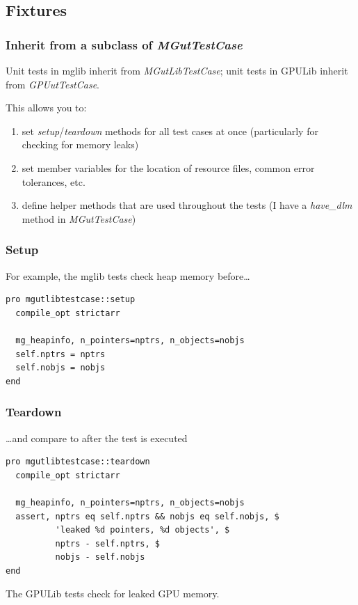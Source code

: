 \documentclass[12pt, handout]{beamer}
\begin{document}
\subsection{Fixtures}

\begin{frame}
  \frametitle{Inherit from a subclass of {\em MGutTestCase}}
Unit tests in mglib inherit from {\em MGutLibTestCase}; unit tests in GPULib inherit from {\em GPUutTestCase}.

This allows you to:
\begin{enumerate}
  \item set {\em setup}/{\em teardown} methods for all test cases at once (particularly for checking for memory leaks)
  \item set member variables for the location of resource files, common error tolerances, etc.
  \item define helper methods that are used throughout the tests (I have a {\em have\_dlm} method in {\em MGutTestCase})
\end{enumerate}
\end{frame}

\begin{frame}[t, fragile]
  \frametitle{Setup}

For example, the mglib tests check heap memory before\ldots
\begin{lstlisting}[basicstyle=\ttfamily\fontsize{10pt}{10pt}\selectfont]
pro mgutlibtestcase::setup
  compile_opt strictarr

  mg_heapinfo, n_pointers=nptrs, n_objects=nobjs
  self.nptrs = nptrs
  self.nobjs = nobjs
end
\end{lstlisting}
\end{frame}

\begin{frame}[t, fragile]
  \frametitle{Teardown}

\ldots and compare to after the test is executed
\begin{lstlisting}[basicstyle=\ttfamily\fontsize{10pt}{10pt}\selectfont]
pro mgutlibtestcase::teardown
  compile_opt strictarr

  mg_heapinfo, n_pointers=nptrs, n_objects=nobjs
  assert, nptrs eq self.nptrs && nobjs eq self.nobjs, $
          'leaked %d pointers, %d objects', $
          nptrs - self.nptrs, $
          nobjs - self.nobjs
end
\end{lstlisting}
The GPULib tests check for leaked GPU memory.
\end{frame}
\end{document}
